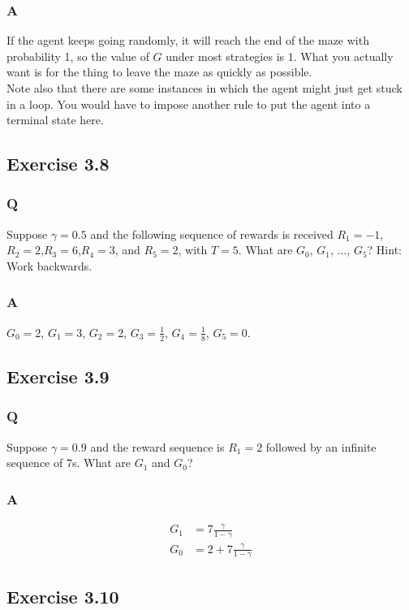\subsubsection*{A}
If the agent keeps going randomly, it will reach the end of the maze with probability 1, so the value of $G$ under most strategies is $1$. What you actually want is for the thing to leave the maze as quickly as possible.\\

Note also that there are some instances in which the agent might just get stuck in a loop. You would have to impose another rule to put the agent into a terminal state here.

\subsection{Exercise 3.8}
\subsubsection*{Q}
Suppose $\gamma = 0.5$ and the following sequence of rewards is received $R_1=-1$, $R_2 =2$,$R_3 =6$,$R_4 =3$, and $R_5 =2$, with $T =5$. What are $G_0$, $G_1$, $\dots$, $G_5$? Hint: Work backwards.

\subsubsection*{A}
$G_0 = 2$, $G_1 = 3$, $G_2 = 2$, $G_3 = \frac12$, $G_4 = \frac18$, $G_5=0$.

\subsection{Exercise 3.9}
\subsubsection*{Q}
Suppose $\gamma = 0.9$ and the reward sequence is $R_1 = 2$ followed by an infinite sequence of $7$s. What are $G_1$ and $G_0$?
\subsubsection*{A}
\begin{align}
    G_1 &= 7 \frac{\gamma}{1 - \gamma} \\
    G_0 &= 2 + 7 \frac{\gamma}{1 - \gamma}
\end{align}


\subsection{Exercise 3.10}

